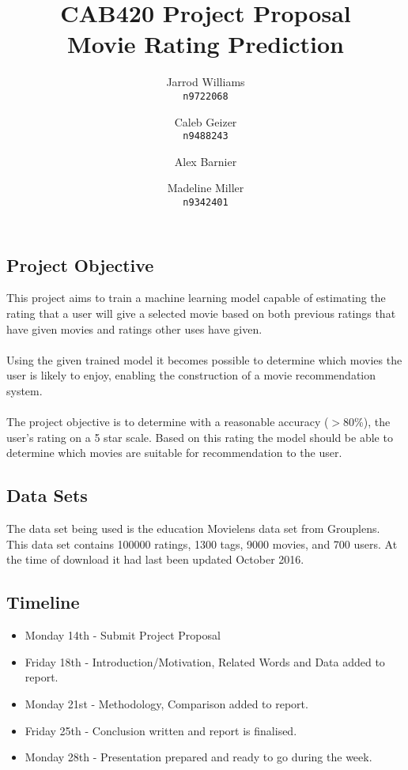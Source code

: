 \documentclass[]{report}   %
\begin{document}
\title{CAB420 Project Proposal \\ \large{Movie Rating Prediction}}   %
\author{
	Jarrod Williams\\
	\texttt{n9722068}
	\and 
	Caleb Geizer\\
	\texttt{n9488243}
	\and
	Alex Barnier\\
	\texttt{}
	\and	
	Madeline Miller\\
	\texttt{n9342401}
}
\maketitle

\subsection*{Project Objective}
This project aims to train a machine learning model capable of estimating the rating that a user will give a selected movie based on both previous ratings that have given movies and ratings other uses have given. 
\\~\\
Using the given trained model it becomes possible to determine which movies the user is likely to enjoy, enabling the construction of a movie recommendation system.
\\~\\
The project objective is to determine with a reasonable accuracy ($>$80\%), the user's rating on a 5 star scale. Based on this rating the model should be able to determine which movies are suitable for recommendation to the user.
\subsection*{Data Sets}
The data set being used is the education Movielens data set from Grouplens. This data set contains 100000 ratings, 1300 tags, 9000 movies, and 700 users. At the time of download it had last been updated October 2016.

\subsection*{Timeline}
\begin{itemize}
  \item Monday 14th - Submit Project Proposal 
  \item Friday 18th - Introduction/Motivation, Related Words and Data added to report.
  \item Monday 21st - Methodology, Comparison added to report.
  \item Friday 25th - Conclusion written and report is finalised.
  \item Monday 28th - Presentation prepared and ready to go during the week.
\end{itemize}
\end{document}
